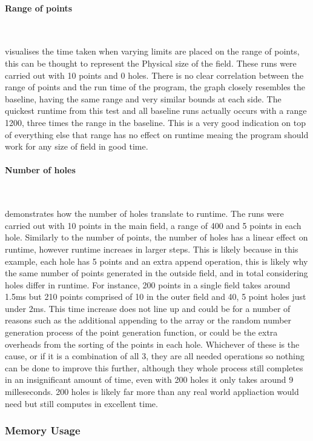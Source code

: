 \documentclass[final]{cmpreport_02}
\begin{document}
\paragraph{Range of points} \

 visualises the time taken when varying limits are placed on the range of points, this can be thought to represent the Physical size of the field.
These runs were carried out with 10 points and 0 holes.
There is no clear correlation between the range of points and the run time of the program, the graph closely resembles the baseline, having the same range and very similar bounds at each side.
The quickest runtime from this test and all baseline runs actually occurs with a range 1200, three times the range in the baseline.
This is a very good indication on top of everything else that range has no effect on runtime meaing the program should work for any size of field in good time.

\paragraph{Number of holes} \

 demonstrates how the number of holes translate to runtime.
The runs were carried out with 10 points in the main field, a range of 400 and 5 points in each hole.
Similarly to the number of points, the number of holes has a linear effect on runtime, however runtime increaes in larger steps.
This is likely because in this example, each hole has 5 points and an extra append operation, this is likely why the same number of points generated in the outside field, and in total considering holes differ in runtime.
For instance, 200 points in a single field takes around 1.5ms but 210 points comprised of 10 in the outer field and 40, 5 point holes just under 2ms.
This time increase does not line up and could be for a number of reasons such as the additional appending to the array or the random number generation process of the point generation function, or could be the extra overheads from the sorting of the points in each hole.
Whichever of these is the cause, or if it is a combination of all 3, they are all needed operations so nothing can be done to improve this further, although they whole process still completes in an insignificant amount of time, even with 200 holes it only takes around 9 milleseconds.
200 holes is likely far more than any real world appliaction would need but still computes in excellent time.


\subsubsection{Memory Usage}
\end{document}
